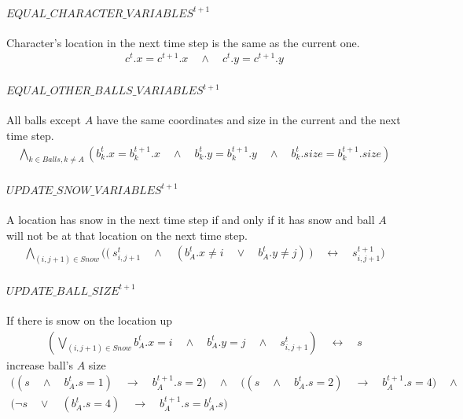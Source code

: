 \documentclass{report}
\theoremstyle{plain}
\begin{document}
\paragraph{$EQUAL\_CHARACTER\_VARIABLES^{t+1}$}
Character's location in the next time step is the same as the current one.
\begin{align*}
c^t.x = c^{t+1}.x \quad \wedge \quad c^t.y = c^{t+1}.y
\end{align*}

\paragraph{$EQUAL\_OTHER\_BALLS\_VARIABLES^{t+1}$}
All balls except $A$ have the same coordinates and size in the current and the next time step.
\begin{align*}
\bigwedge \limits_{k \in Balls, k \neq A} (b_k^t.x = b_k^{t+1}.x \quad \wedge \quad b_k^t.y = b_k^{t+1}.y \quad \wedge \quad b_k^t.size = b_k^{t+1}.size)
\end{align*}

\paragraph{$UPDATE\_SNOW\_VARIABLES^{t+1}$}
A location has snow in the next time step if and only if it has snow and ball $A$ will not be at that location on the next time step.
\begin{align*}
\bigwedge \limits_{(i, j+1) \in Snow} \Big( \big(\ s_{i,j + 1}^t \quad \wedge \quad (b_A^t.x \neq i \quad \vee \quad b_A^t.y \neq j)\ \big) \quad \leftrightarrow \quad s_{i,j + 1}^{t+1}\Big)
\end{align*}

\paragraph{$UPDATE\_BALL\_SIZE^{t+1}$}
If there is snow on the location up
\begin{align*}
(\bigvee \limits_{(i,j+1) \in Snow} b_A^t.x = i \quad \wedge \quad b_A^t.y = j \quad \wedge \quad s_{i,j+1}^t) \quad \leftrightarrow \quad s
\end{align*}
increase ball's $A$ size
\begin{multline*}
\big((s \quad \wedge \quad b_A^t.s = 1) \quad \rightarrow \quad b_A^{t+1}.s = 2\big) \quad \wedge \quad \big((s \quad \wedge \quad b_A^t.s = 2) \quad \rightarrow \quad b_A^{t+1}.s = 4\big) \quad \wedge \quad \\ \big(\lnot s \quad \vee \quad (b_A^t.s = 4) \quad \rightarrow \quad b_A^{t+1}.s = b_A^t.s\big)
\end{multline*}
\end{document}
